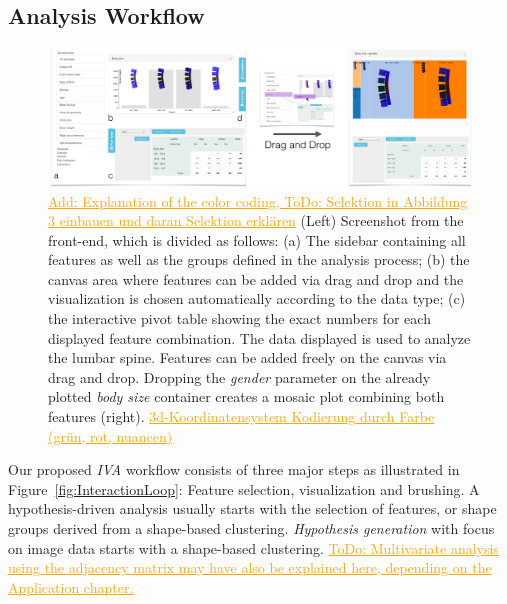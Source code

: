 \documentclass[journal]{style/vgtc} 			          %
\newcommand{\com}[1]{\textcolor{orange}{\uline{#1}}}
\begin{document}
\subsection{Analysis Workflow}
\begin{figure}[htb]
 \centering
 \includegraphics[width=1\textwidth, resolution=300]{figures/visualization}
 \caption{\com{Add: Explanation of the color coding, ToDo: Selektion in Abbildung 3 einbauen und daran Selektion erklären}
 (Left) Screenshot from the front-end, which is divided as follows: (a) The sidebar containing all features as well as the groups defined in the analysis process; (b) the canvas area where features can be added via drag and drop and the visualization is chosen automatically according to the data type; (c) the interactive pivot table showing the exact numbers for each displayed feature combination.
 The data displayed is used to analyze the lumbar spine. Features can be added freely on the canvas via drag and drop.
 Dropping the \emph{gender} parameter on the already plotted \emph{body size} container creates a mosaic plot combining both features (right).
 \com{3d-Koordinatensystem Kodierung durch Farbe (grün, rot, nuancen)}
 }
 \label{fig:visualization}
\end{figure}
Our proposed \emph{IVA} workflow consists of three major steps as illustrated in Figure~\ref{fig:InteractionLoop}: Feature selection, visualization and brushing.
%
A hypothesis-driven analysis usually starts with the selection of features, or shape groups derived from a shape-based clustering.
%
\emph{Hypothesis generation} with focus on image data starts with a shape-based clustering.
%
\com{ToDo: Multivariate analysis using the adjacency matrix may have also be explained here, depending on the Application chapter.}
\end{document}
